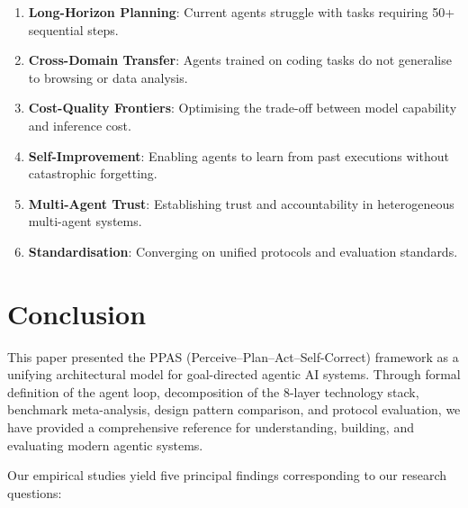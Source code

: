 \documentclass[12pt, a4paper]{article}
\begin{document}
\begin{enumerate}
    \item \textbf{Long-Horizon Planning}: Current agents struggle with tasks requiring 50+ sequential steps.
    \item \textbf{Cross-Domain Transfer}: Agents trained on coding tasks do not generalise to browsing or data analysis.
    \item \textbf{Cost-Quality Frontiers}: Optimising the trade-off between model capability and inference cost.
    \item \textbf{Self-Improvement}: Enabling agents to learn from past executions without catastrophic forgetting.
    \item \textbf{Multi-Agent Trust}: Establishing trust and accountability in heterogeneous multi-agent systems.
    \item \textbf{Standardisation}: Converging on unified protocols and evaluation standards.
\end{enumerate}

\section{Conclusion}\label{sec:conclusion}

This paper presented the PPAS (Perceive--Plan--Act--Self-Correct) framework as a unifying architectural model for goal-directed agentic AI systems. Through formal definition of the agent loop, decomposition of the 8-layer technology stack, benchmark meta-analysis, design pattern comparison, and protocol evaluation, we have provided a comprehensive reference for understanding, building, and evaluating modern agentic systems.

Our empirical studies yield five principal findings corresponding to our research questions:
\end{document}
